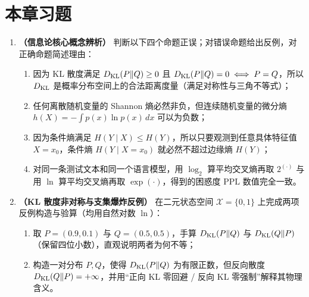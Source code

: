 \section{本章习题}
\label{sec:ch4-exercises}


\begin{enumerate}[label=\textbf{4.\arabic*}, leftmargin=2.4em]
  \item \textbf{（信息论核心概念辨析）} 判断以下四个命题正误；对错误命题给出反例，对正确命题简述理由：
  \begin{enumerate}[label=(\alph*), leftmargin=1.8em]
    \item 因为 KL 散度满足 $D_{\mathrm{KL}}(P\|Q) \ge 0$ 且 $D_{\mathrm{KL}}(P\|Q)=0 \iff P=Q$，所以 $D_{\mathrm{KL}}$ 是概率分布空间上的合法距离度量（满足对称性与三角不等式）；
    \item 任何离散随机变量的 Shannon 熵必然非负，但连续随机变量的微分熵 $h(X) = -\int p(x)\ln p(x)\,dx$ 可以为负数；
    \item 因为条件熵满足 $H(Y \mid X) \le H(Y)$，所以只要观测到任意具体特征值 $X = x_0$，条件熵 $H(Y \mid X = x_0)$ 就必然不超过边缘熵 $H(Y)$；
    \item 对同一条测试文本和同一个语言模型，用 $\log_2$ 算平均交叉熵再取 $2^{(\cdot)}$ 与用 $\ln$ 算平均交叉熵再取 $\exp(\cdot)$，得到的困惑度 $\mathrm{PPL}$ 数值完全一致。
  \end{enumerate}

  \item \textbf{（KL 散度非对称与支集爆炸反例）} 在二元状态空间 $\mathcal{X} = \{0, 1\}$ 上完成两项反例构造与验算（均用自然对数 $\ln$）：
  \begin{enumerate}[label=(\arabic*), leftmargin=1.8em]
    \item 取 $P = (0.9, 0.1)$ 与 $Q = (0.5, 0.5)$，手算 $D_{\mathrm{KL}}(P\|Q)$ 与 $D_{\mathrm{KL}}(Q\|P)$（保留四位小数），直观说明两者为何不等；
    \item 构造一对分布 $P, Q$，使得 $D_{\mathrm{KL}}(P\|Q)$ 为有限正数，但反向散度 $D_{\mathrm{KL}}(Q\|P) = +\infty$，并用“正向 KL 零回避 / 反向 KL 零强制”解释其物理含义。
  \end{enumerate}
\end{enumerate}


